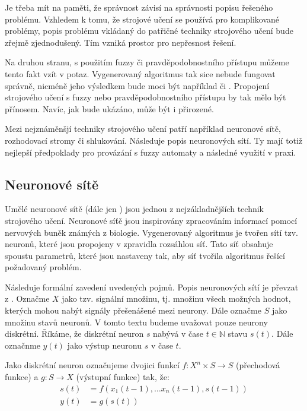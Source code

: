 \documentclass[a4paper,10pt]{article}
\begin{document}
Je třeba mít na paměti, že správnost  závisí na správnosti popisu řešeného problému. Vzhledem k tomu, že strojové učení se používá pro komplikované problémy, popis problému vkládaný do patřičné techniky strojového učení bude zřejmě zjednodušený. Tím vzniká prostor pro nepřesnost řešení.

Na druhou stranu, s použitím fuzzy či pravděpodobnostního přístupu můžeme tento fakt vzít v potaz. Vygenerovaný algoritmus tak sice nebude fungovat správně, nicméně jeho výsledkem bude moci být například  či . Propojení strojového učení s fuzzy nebo pravděpodobnostního přístupu by tak mělo být přínosem. Navíc, jak bude ukázáno, může být i přirozené.

Mezi nejznáměnšjí techniky strojového učení patří například neuronové sítě, rozhodovací stromy či shlukování. Následuje popis neuronových sítí. Ty mají totiž nejlepší předpoklady pro provázání s fuzzy automaty a následné využití v praxi.

\subsection{Neuronové sítě}
Umělé neuronové sítě (dále jen ) jsou jednou z nejzákladnějších technik strojového učení. Neuronové síťě jsou inspirovány zpracováním informací pomocí nervových buněk známých z biologie. Vygenerovaný algoritmus je tvořen sítí tzv. neuronů, které jsou propojeny v zpravidla rozsáhlou síť. Tato síť obsahuje spoustu parametrů, které jsou nastaveny tak, aby síť tvořila algoritmus řešící požadovaný problém. 

Následuje formální zavedení uvedených pojmů. Popis neuronových sítí je převzat z \cite{FieRus-HanNeuCom}. Označme $X$ jako tzv. signální množinu, tj. množinu všech možných hodnot, kterých mohou nabýt signály přešenášené mezi neurony. Dále označme $S$ jako množinu stavů neuronů. V tomto textu budeme uvažovat pouze neurony diskrétní. Říkáme, že diskrétní neuron $s$ nabývá v čase $t \in \mathbb{N}$ stavu $s(t)$. Dále označnme $y(t)$ jako výstup neuronu $s$ v čase $t$.

\begin{definition}
 Jako diskrétní neuron označujeme dvojici funkcí $f: X^n \times S \rightarrow S$ (přechodová funkce) a $g: S \rightarrow X$ (výstupní funkce) tak, že:
 \begin{align*}
  s(t) &= f(x_1(t - 1), \dots x_n(t - 1), s(t - 1)) \\
  y(t) &= g(s(t))
 \end{align*}
\end{definition}
\end{document}
